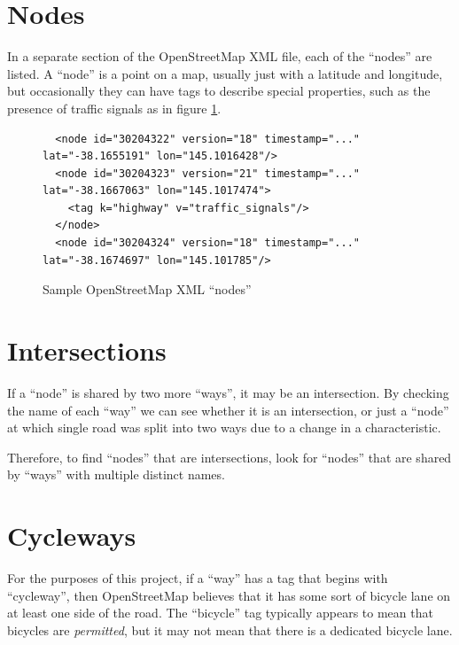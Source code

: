 \documentclass[11pt,twoside]{report}
\begin{document}
\clearpage
\section{Nodes}
\label{osm:nodes}

In a separate section of the OpenStreetMap XML file, each of the ``nodes'' are listed.  A ``node'' is a point on a map, usually just with a latitude and longitude, but occasionally they can have tags to describe special properties, such as the presence of traffic signals as in figure \ref{xml:way_nodes}.\\

\begin{figure}[h]
\centering
\begin{verbatim}
  <node id="30204322" version="18" timestamp="..." lat="-38.1655191" lon="145.1016428"/>
  <node id="30204323" version="21" timestamp="..." lat="-38.1667063" lon="145.1017474">
    <tag k="highway" v="traffic_signals"/>
  </node>
  <node id="30204324" version="18" timestamp="..." lat="-38.1674697" lon="145.101785"/>	
\end{verbatim}
\caption{Sample OpenStreetMap XML ``nodes''}
\label{xml:way_nodes}
\end{figure}

\section{Intersections}
\label{osm:intersections}

If a ``node'' is shared by two more ``ways'', it may be an intersection.  By checking the name of each ``way'' we can see whether it is an intersection, or just a ``node'' at which single road was split into two ways due to a change in a characteristic.

Therefore, to find ``nodes'' that are intersections, look for ``nodes'' that are shared by ``ways'' with multiple distinct names.

\section{Cycleways}
\label{osm:cycleways}

For the purposes of this project, if a ``way'' has a tag that begins with ``cycleway'', then OpenStreetMap believes that it has some sort of bicycle lane on at least one side of the road.  The ``bicycle'' tag typically appears to mean that bicycles are \textit{permitted}, but it may not mean that there is a dedicated bicycle lane.
\end{document}
